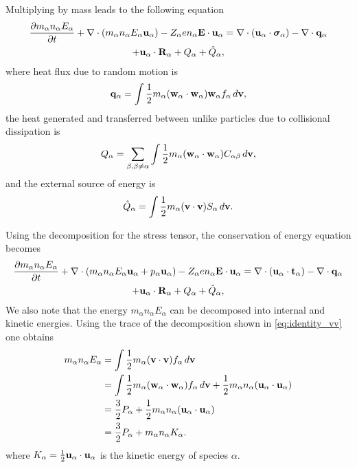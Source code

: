\documentclass[a4paper,11pt]{report}
\begin{document}
Multiplying by mass leads to the following equation
\begin{multline}
\label{eq:energy_derv_5}
\frac{\partial m_\alpha n_\alpha E_\alpha}{\partial t} + \nabla \cdot (m_\alpha n_\alpha E_\alpha \mathbf{u}_\alpha ) - Z_\alpha e n_\alpha \mathbf{E} \cdot \mathbf{u}_\alpha = \nabla \cdot ( \mathbf{u}_\alpha \cdot \boldsymbol{\sigma}_\alpha ) - \nabla \cdot \mathbf{q}_\alpha \\
+ \mathbf{u}_\alpha \cdot \mathbf{R}_\alpha + Q_{\alpha} + \hat{Q}_\alpha, 
\end{multline}
where heat flux due to random motion is
\begin{equation}
\mathbf{q}_\alpha = \int \frac{1}{2} m_\alpha (\mathbf{w}_\alpha \cdot \mathbf{w}_\alpha ) \mathbf{w}_\alpha f_\alpha \, d\mathbf{v},
\end{equation}
the heat generated and transferred between unlike particles due to collisional dissipation is 
\begin{equation}
Q_{\alpha} = \sum_{\beta,\beta \ne \alpha} \int \frac{1}{2} m_\alpha (\mathbf{w}_\alpha \cdot \mathbf{w}_\alpha) C_{\alpha \beta} \, d\mathbf{v},
\end{equation}
and the external source of energy is
\begin{equation}
\hat{Q}_\alpha = \int \frac{1}{2} m_\alpha (\mathbf{v} \cdot \mathbf{v}) S_\alpha \, d\mathbf{v}.
\end{equation}

Using the decomposition for the stress tensor, the conservation of energy equation becomes
\begin{multline}
\label{eq:energy_derv_6}
\frac{\partial m_\alpha n_\alpha E_\alpha}{\partial t} + \nabla \cdot (m_\alpha n_\alpha E_\alpha \mathbf{u}_\alpha + p_\alpha \mathbf{u}_\alpha ) - Z_\alpha e n_\alpha \mathbf{E} \cdot \mathbf{u}_\alpha = \nabla \cdot ( \mathbf{u}_\alpha \cdot \mathbf{t}_\alpha ) - \nabla \cdot \mathbf{q}_\alpha \\
+ \mathbf{u}_\alpha \cdot \mathbf{R}_\alpha + Q_{\alpha} + \hat{Q}_\alpha, 
\end{multline}
We also note that the energy $m_\alpha n_\alpha E_\alpha$ can be decomposed into internal and kinetic energies. Using the trace of the decomposition shown in \cref{eq:identity_vv} one obtains
\begin{align}
m_\alpha n_\alpha E_\alpha & = \int \frac{1}{2} m_\alpha (\mathbf{v} \cdot \mathbf{v}) f_\alpha \, d\mathbf{v} \nonumber \\
& = \int \frac{1}{2} m_\alpha (\mathbf{w}_\alpha \cdot \mathbf{w}_\alpha) f_\alpha \, d\mathbf{v} + \frac{1}{2} m_\alpha n_\alpha (\mathbf{u}_\alpha \cdot \mathbf{u}_\alpha) \nonumber \\
& = \frac{3}{2} P_\alpha + \frac{1}{2} m_\alpha n_\alpha (\mathbf{u}_\alpha \cdot \mathbf{u}_\alpha) \nonumber \\
& = \frac{3}{2} P_\alpha + m_\alpha n_\alpha K_\alpha.
\end{align}
where $K_\alpha = \frac{1}{2} \mathbf{u}_\alpha \cdot \mathbf{u}_\alpha$ is the kinetic energy of species $\alpha$.
\end{document}
